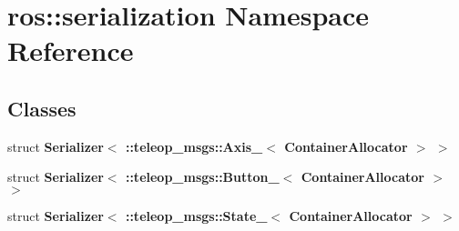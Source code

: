 \section{ros::serialization Namespace Reference}
\label{namespaceros_1_1serialization}
\subsection*{Classes}
\begin{DoxyCompactItemize}
\item 
struct {\bf Serializer$<$ ::teleop\_\-msgs::Axis\_\-$<$ ContainerAllocator $>$ $>$}
\item 
struct {\bf Serializer$<$ ::teleop\_\-msgs::Button\_\-$<$ ContainerAllocator $>$ $>$}
\item 
struct {\bf Serializer$<$ ::teleop\_\-msgs::State\_\-$<$ ContainerAllocator $>$ $>$}
\end{DoxyCompactItemize}
